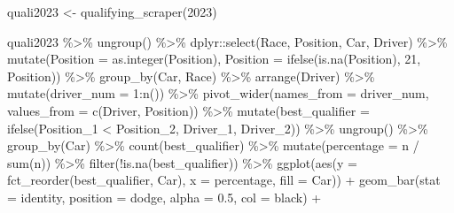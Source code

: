 \documentclass[
]{book}
\newenvironment{Shaded}{\begin{snugshade}}{\end{snugshade}}
\newcommand{\AttributeTok}[1]{\textcolor[rgb]{0.77,0.63,0.00}{#1}}
\newcommand{\DecValTok}[1]{\textcolor[rgb]{0.00,0.00,0.81}{#1}}
\newcommand{\FloatTok}[1]{\textcolor[rgb]{0.00,0.00,0.81}{#1}}
\newcommand{\FunctionTok}[1]{\textcolor[rgb]{0.00,0.00,0.00}{#1}}
\newcommand{\NormalTok}[1]{#1}
\newcommand{\OtherTok}[1]{\textcolor[rgb]{0.56,0.35,0.01}{#1}}
\newcommand{\SpecialCharTok}[1]{\textcolor[rgb]{0.00,0.00,0.00}{#1}}
\newcommand{\StringTok}[1]{\textcolor[rgb]{0.31,0.60,0.02}{#1}}
\begin{document}
\begin{Shaded}
\begin{Highlighting}[]
\NormalTok{quali2023 }\OtherTok{\textless{}{-}} \FunctionTok{qualifying\_scraper}\NormalTok{(}\DecValTok{2023}\NormalTok{)}

\NormalTok{quali2023 }\SpecialCharTok{\%\textgreater{}\%}
  \FunctionTok{ungroup}\NormalTok{() }\SpecialCharTok{\%\textgreater{}\%}
\NormalTok{  dplyr}\SpecialCharTok{::}\FunctionTok{select}\NormalTok{(Race, Position, Car, Driver) }\SpecialCharTok{\%\textgreater{}\%}
  \FunctionTok{mutate}\NormalTok{(}\AttributeTok{Position =} \FunctionTok{as.integer}\NormalTok{(Position),}
         \AttributeTok{Position =} \FunctionTok{ifelse}\NormalTok{(}\FunctionTok{is.na}\NormalTok{(Position), }\DecValTok{21}\NormalTok{, Position)) }\SpecialCharTok{\%\textgreater{}\%} 
  \FunctionTok{group\_by}\NormalTok{(Car, Race) }\SpecialCharTok{\%\textgreater{}\%} 
  \FunctionTok{arrange}\NormalTok{(Driver) }\SpecialCharTok{\%\textgreater{}\%} 
  \FunctionTok{mutate}\NormalTok{(}\AttributeTok{driver\_num =} \DecValTok{1}\SpecialCharTok{:}\FunctionTok{n}\NormalTok{()) }\SpecialCharTok{\%\textgreater{}\%} 
  \FunctionTok{pivot\_wider}\NormalTok{(}\AttributeTok{names\_from =} \StringTok{\textquotesingle{}driver\_num\textquotesingle{}}\NormalTok{, }\AttributeTok{values\_from =} \FunctionTok{c}\NormalTok{(}\StringTok{\textquotesingle{}Driver\textquotesingle{}}\NormalTok{, }\StringTok{\textquotesingle{}Position\textquotesingle{}}\NormalTok{)) }\SpecialCharTok{\%\textgreater{}\%}
  \FunctionTok{mutate}\NormalTok{(}\AttributeTok{best\_qualifier =} \FunctionTok{ifelse}\NormalTok{(Position\_1 }\SpecialCharTok{\textless{}}\NormalTok{ Position\_2, Driver\_1, Driver\_2)) }\SpecialCharTok{\%\textgreater{}\%}
  \FunctionTok{ungroup}\NormalTok{() }\SpecialCharTok{\%\textgreater{}\%}
  \FunctionTok{group\_by}\NormalTok{(Car) }\SpecialCharTok{\%\textgreater{}\%}
  \FunctionTok{count}\NormalTok{(best\_qualifier) }\SpecialCharTok{\%\textgreater{}\%}
  \FunctionTok{mutate}\NormalTok{(}\AttributeTok{percentage =}\NormalTok{ n }\SpecialCharTok{/} \FunctionTok{sum}\NormalTok{(n)) }\SpecialCharTok{\%\textgreater{}\%}
  \FunctionTok{filter}\NormalTok{(}\SpecialCharTok{!}\FunctionTok{is.na}\NormalTok{(best\_qualifier)) }\SpecialCharTok{\%\textgreater{}\%}  
  \FunctionTok{ggplot}\NormalTok{(}\FunctionTok{aes}\NormalTok{(}\AttributeTok{y =} \FunctionTok{fct\_reorder}\NormalTok{(best\_qualifier, Car), }\AttributeTok{x =}\NormalTok{ percentage, }\AttributeTok{fill =}\NormalTok{ Car)) }\SpecialCharTok{+}
  \FunctionTok{geom\_bar}\NormalTok{(}\AttributeTok{stat =} \StringTok{\textquotesingle{}identity\textquotesingle{}}\NormalTok{, }\AttributeTok{position =} \StringTok{\textquotesingle{}dodge\textquotesingle{}}\NormalTok{, }\AttributeTok{alpha =} \FloatTok{0.5}\NormalTok{, }\AttributeTok{col =} \StringTok{\textquotesingle{}black\textquotesingle{}}\NormalTok{) }\SpecialCharTok{+}

\end{Highlighting}
\end{Shaded}
\end{document}
